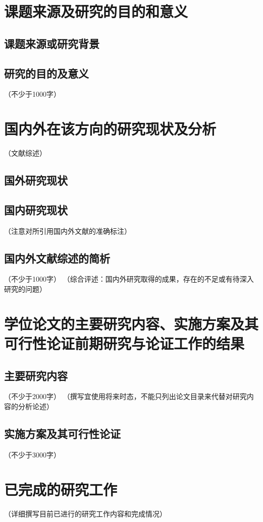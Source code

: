 \documentclass[proposal]{sysuthesis}
\begin{document}
    
\section{课题来源及研究的目的和意义}
\subsection{课题来源或研究背景}
\subsection{研究的目的及意义}
（不少于1000字）

\section{国内外在该方向的研究现状及分析}
（文献综述）
\subsection{国外研究现状}
\subsection{国内研究现状}
（注意对所引用国内外文献的准确标注）
\subsection{国内外文献综述的简析}
（不少于1000字）
（综合评述：国内外研究取得的成果，存在的不足或有待深入研究的问题）

\section{学位论文的主要研究内容、实施方案及其可行性论证前期研究与论证工作的结果}
\subsection{主要研究内容}
（不少于2000字）
（撰写宜使用将来时态，不能只列出论文目录来代替对研究内容的分析论述）
\subsection{实施方案及其可行性论证}
（不少于3000字）

\section{已完成的研究工作}
（详细撰写目前已进行的研究工作内容和完成情况）
\end{document}
